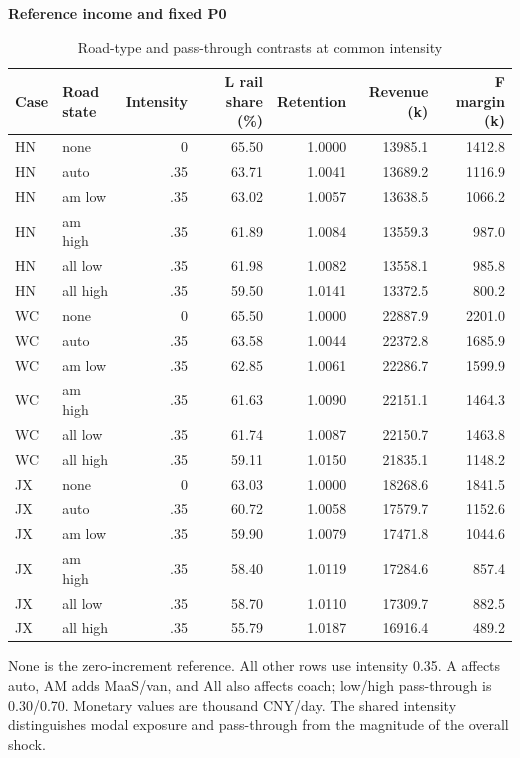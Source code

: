 \begin{table}[htbp]\centering
\caption{Road-type and pass-through contrasts at common intensity}\label{tab:review_road_contrasts}
\begin{minipage}{.95\textwidth}\fontsize{8}{10}\selectfont{}\setlength{\tabcolsep}{2pt}\renewcommand{\arraystretch}{1.08}
\par\noindent\textbf{Reference income and fixed P0}\par\smallskip
\begin{tabular*}{\linewidth}{@{\extracolsep{\fill}}llrrrrr@{}}\toprule
Case & Road state & Intensity & L rail share (\%) & Retention & Revenue (k) & F margin (k) \\
\midrule
HN & none & 0 & 65.50 & 1.0000 & 13985.1 & 1412.8 \\
HN & auto & .35 & 63.71 & 1.0041 & 13689.2 & 1116.9 \\
HN & am low & .35 & 63.02 & 1.0057 & 13638.5 & 1066.2 \\
HN & am high & .35 & 61.89 & 1.0084 & 13559.3 & 987.0 \\
HN & all low & .35 & 61.98 & 1.0082 & 13558.1 & 985.8 \\
HN & all high & .35 & 59.50 & 1.0141 & 13372.5 & 800.2 \\
WC & none & 0 & 65.50 & 1.0000 & 22887.9 & 2201.0 \\
WC & auto & .35 & 63.58 & 1.0044 & 22372.8 & 1685.9 \\
WC & am low & .35 & 62.85 & 1.0061 & 22286.7 & 1599.9 \\
WC & am high & .35 & 61.63 & 1.0090 & 22151.1 & 1464.3 \\
WC & all low & .35 & 61.74 & 1.0087 & 22150.7 & 1463.8 \\
WC & all high & .35 & 59.11 & 1.0150 & 21835.1 & 1148.2 \\
JX & none & 0 & 63.03 & 1.0000 & 18268.6 & 1841.5 \\
JX & auto & .35 & 60.72 & 1.0058 & 17579.7 & 1152.6 \\
JX & am low & .35 & 59.90 & 1.0079 & 17471.8 & 1044.6 \\
JX & am high & .35 & 58.40 & 1.0119 & 17284.6 & 857.4 \\
JX & all low & .35 & 58.70 & 1.0110 & 17309.7 & 882.5 \\
JX & all high & .35 & 55.79 & 1.0187 & 16916.4 & 489.2 \\
\bottomrule\end{tabular*}\par\medskip
\par\noindent\fontsize{8}{9.5}\selectfont None is the zero-increment reference. All other rows use intensity 0.35. A affects auto, AM adds MaaS/van, and All also affects coach; low/high pass-through is 0.30/0.70. Monetary values are thousand CNY/day. The shared intensity distinguishes modal exposure and pass-through from the magnitude of the overall shock.
\end{minipage}\end{table}
